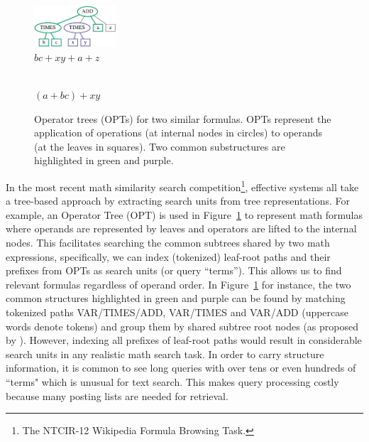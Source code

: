 \documentclass[runningheads]{llncs}
\begin{document}
\begin{figure}[!t]

\begin{center}
\begin{minipage}[b]{1.5in}
\begin{center}
\includegraphics[width=1.2in]{fig/tree3.eps}\\
$bc + xy + a + z$
\end{center}
\end{minipage}
\hspace*{.0in}
\begin{minipage}[b]{1.5in}
\begin{center}
\\
$(a + bc) + xy$
\end{center}
\end{minipage}
\end{center}

\caption{Operator trees (OPTs) for two similar formulas. OPTs represent the application of operations (at internal nodes in circles) to operands (at the leaves in squares). Two common substructures are highlighted in green and purple.}
\label{intro}
\end{figure}

In the most recent math similarity search competition\footnote{The NTCIR-12 Wikipedia Formula Browsing Task.}, effective systems all take a tree-based approach by extracting search units from tree representations.
For example, an Operator Tree (OPT) is used in Figure~\ref{intro} to represent math formulas where operands are represented by leaves and operators are lifted to the internal nodes.
This facilitates searching the common subtrees shared by two math expressions, specifically, we can index (tokenized) leaf-root paths and their prefixes from OPTs as search units (or query ``terms''). This allows us to find relevant formulas regardless of operand order.
In Figure~\ref{intro} for instance, the two common structures highlighted in green and purple can be found by matching tokenized paths VAR/TIMES/ADD, VAR/TIMES and VAR/ADD (uppercase words denote tokens) and group them by shared subtree root nodes (as proposed by \cite{a0_2019}).
However, indexing all prefixes of leaf-root paths would result in considerable search units in any realistic math search task. In order to carry structure information, it is common to see long queries with over tens or even hundreds of ``terms" which is unusual for text search. This makes query processing costly because many posting lists are needed for retrieval.
\end{document}
